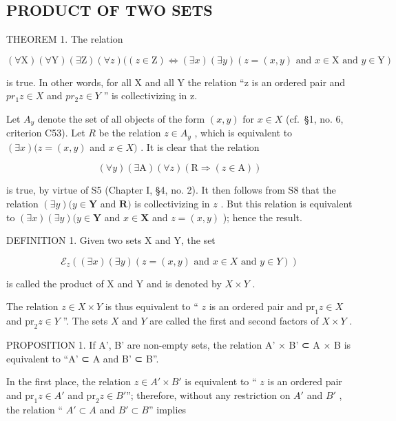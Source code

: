 \subsection{PRODUCT OF TWO SETS}

THEOREM 1. The relation

\[
(\forall \mathrm{X}) (\forall \mathrm{Y}) (\exists \mathrm{Z}) (\forall z) ((z \in \mathrm{Z}) \iff (\exists x) (\exists y) (z = (x, y) \text {   and   } x \in \mathrm{X} \text {   and   } y \in \mathrm{Y})
\]

is true. In other words, for all X and all Y the relation ``z is an ordered pair and \(pr_{1}z \in X\) and \(pr_{2}z \in Y\) '' is collectivizing in z.

Let \(A_y\) denote the set of all objects of the form \((x, y)\) for \(x \in X\) (cf.~§1, no. 6, criterion C53). Let \(R\) be the relation \(z \in A_y\) , which is equivalent to \((\exists x)(z = (x, y)\) and \(x \in X)\) . It is clear that the relation

\[
(\forall y) (\exists \mathrm{A}) (\forall z) (\mathrm{R} \Longrightarrow (z \in \mathrm{A}))
\]

is true, by virtue of S5 (Chapter I, §4, no. 2). It then follows from S8 that the relation \((\exists y)(y \in \mathbf{Y}\) and \(\mathbf{R})\) is collectivizing in \(z\) . But this relation is equivalent to \((\exists x)(\exists y)(y \in \mathbf{Y}\) and \(x \in \mathbf{X}\) and \(z = (x, y)\) ); hence the result.

DEFINITION 1. Given two sets X and Y, the set

\[
\mathcal {E} _ {z} ((\exists x) (\exists y) (z = (x, y) \text {   and   } x \in X \text {   and   } y \in Y))
\]

is called the product of X and Y and is denoted by \(X \times Y\) .

The relation \(z \in X \times Y\) is thus equivalent to `` \(z\) is an ordered pair and \(\text{pr}_1z \in X\) and \(\text{pr}_2z \in Y\) ''. The sets \(X\) and \(Y\) are called the first and second factors of \(X \times Y\) .

PROPOSITION 1. If A', B' are non-empty sets, the relation A' × B' ⊂ A × B is equivalent to ``A' ⊂ A and B' ⊂ B''.

In the first place, the relation \(z \in A' \times B'\) is equivalent to `` \(z\) is an ordered pair and \(\mathrm{pr}_1z \in A'\) and \(\mathrm{pr}_2z \in B'\)''; therefore, without any restriction on \(A'\) and \(B'\) , the relation `` \(A' \subset A\) and \(B' \subset B\)'' implies

